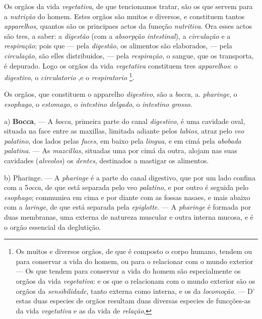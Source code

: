 Os orgãos da vida \emph{vegetativa}, de que tencionamos tratar, são os que servem para a \emph{nutrição} do homem. Estes orgãos são muitos e diversos, e   constituem tantos \emph{apparelhos}, quantos são os principaes actos da funeção \emph{nutritiva}. Ora esses actos são tres, a saber: a \emph{digestão} (com a \emph{absorpção intestinal}), a \emph{circulação} e a \emph{respiração}; pois que --- pela \emph{digestão}, os alimentos são elaborados, --- pela \emph{circulação}, são elles distribuidos, --- pela \emph{respiração}, o sangue, que os transporta, é depurado. Logo os orgãos da vida \emph{vegetativa} constituem tres \emph{apparelhos}: o \emph{digestivo}, o \emph{circulatorio} ,e o \emph{respiratorio} \footnote{Os muitos e diversos orgãos, de que é composto o corpo humano, tendem ou para conservar a vida do homem, ou para o relacionar com o mundo exterior --- Os que tendem para conservar a vida do homem são especialmente os orgãos da vida \emph{vegetativa}: e os que o relacionam com o mundo exterior são os orgãos da \emph{sensibilidade}, tanto externa como interna, e os da \emph{locomoção}. --- D' estas duas especies de orgãos resultam duas diversas especies de funcções-as da vida \emph{vegetativa} e as da vida de \emph{relação},}.


Os orgãos, que constituem o apparelho \emph{digestivo}, são a \emph{bocca}, a. \emph{pharinge}, o \emph{esophago}, o \emph{estomago}, o \emph{intestino delgado}, o \emph{intestino grosso}.

a) \textbf{Bocca}, --- A \emph{bocca}, primeira parte do canal \emph{digestivo}, é uma cavidade oval, situada na face entre as maxillas, limitada adiante pelos \emph{labios}, atraz pelo \emph{veo palatino}, dos lados pelas \emph{faces}, em baixo pela \emph{lingua}, e em cimá pela \emph{abobada palatina}. --- As \emph{mazcillas}, situadas uma por cimá da outra, alojam nas suas cavidades (\emph{alveolos}) os \emph{dentes}, destinados a mastigar os alimentos.

b) Pharinge. --- A \emph{pharinge} é a parte do canal digestivo, que por um lado confina com a 5\emph{occa}, de que está separada pelo veo \emph{palatino}, e por outro é seguida pelo \emph{esophago}; communiea em cima e por diante com as fossas nasaes, e mais abaixo com a \emph{laringe}, de que está separada pela \emph{epiglotte}. --- A \emph{pharinge} é formada por duas membranas, uma externa de natureza muscular e outra interna mucosa, e é o orgão essencial da deglutição.

